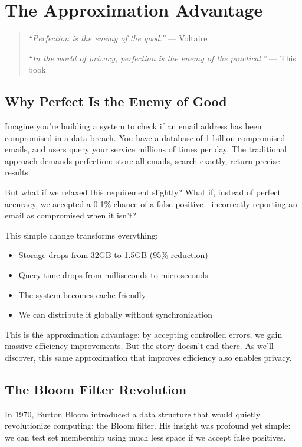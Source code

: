 \chapter{The Approximation Advantage}
\label{ch:approximation}

\begin{quote}
\emph{``Perfection is the enemy of the good.''} — Voltaire

\emph{``In the world of privacy, perfection is the enemy of the practical.''} — This book
\end{quote}

\section{Why Perfect Is the Enemy of Good}

Imagine you're building a system to check if an email address has been compromised in a data breach. You have a database of 1 billion compromised emails, and users query your service millions of times per day. The traditional approach demands perfection: store all emails, search exactly, return precise results.

But what if we relaxed this requirement slightly? What if, instead of perfect accuracy, we accepted a 0.1\% chance of a false positive—incorrectly reporting an email as compromised when it isn't?

This simple change transforms everything:
\begin{itemize}
    \item Storage drops from 32GB to 1.5GB (95\% reduction)
    \item Query time drops from milliseconds to microseconds
    \item The system becomes cache-friendly
    \item We can distribute it globally without synchronization
\end{itemize}

This is the approximation advantage: by accepting controlled errors, we gain massive efficiency improvements. But the story doesn't end there. As we'll discover, this same approximation that improves efficiency also enables privacy.

\section{The Bloom Filter Revolution}

In 1970, Burton Bloom introduced a data structure that would quietly revolutionize computing: the Bloom filter. His insight was profound yet simple: we can test set membership using much less space if we accept false positives.

